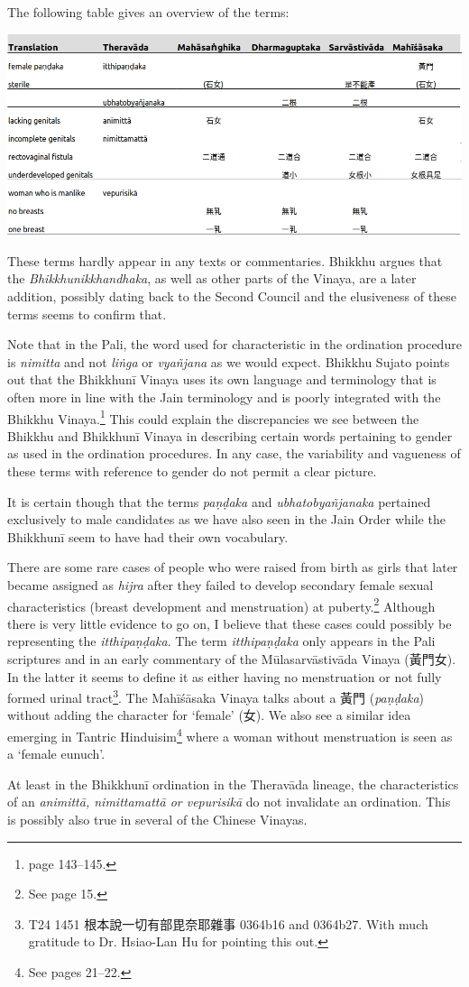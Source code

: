 The following table gives an overview of the terms:

\bigskip
\includegraphics[width=\linewidth]{female.jpg}
\label{female}

These terms hardly appear in any texts or commentaries. Bhikkhu \cite{sujato2009} argues that the {\em Bhikkhunikkhandhaka}, as well as other parts of the Vinaya, are a later addition, possibly dating back to the Second Council and the elusiveness of these terms seems to confirm that. 

Note that in the Pali, the word used for characteristic in the ordination procedure is {\em nimitta} and not {\em liṅga} or {\em vyañ­jana} as we would expect. Bhikkhu Sujato points out that the Bhikkhunī Vinaya uses its own language and terminology that is often more in line with the Jain terminology and is poorly integrated with the Bhikkhu Vinaya.\footnote{\cite{sujato2009} page 143–145.} This could explain the discrepancies we see between the Bhikkhu and Bhikkhunī Vinaya in describing certain words pertaining to gender as used in the ordination procedures. In any case, the variability and vagueness of these terms with reference to gender do not permit a clear picture. 

It is certain though that the terms {\em paṇḍaka} and {\em ubhatob­yañ­janaka} pertained exclusively to male candidates as we have also seen in the Jain Order while the Bhikkhunī seem to have had their own vocabulary.

There are some rare cases of people who were raised from birth as girls that later became assigned as {\em hijra} after they failed to develop secondary female sexual characteristics (breast development and menstruation) at puberty.\footnote{See \cite{nanda} page 15.} Although there is very little evidence to go on, I believe that these cases could possibly be representing the {\em itthipaṇḍaka}. The term {\em itthipaṇḍaka} only appears in the Pali scriptures and in an early commentary of the Mūlasarvāstivāda Vinaya (黃門女). In the latter it seems to define it as either having no menstruation or not fully formed urinal tract\footnote{T24 1451 根本說一切有部毘奈耶雜事 0364b16 and 0364b27. With much gratitude to Dr. Hsiao-Lan Hu for pointing this out.}. The Mahīśāsaka Vinaya talks about a 黃門 ({\em paṇḍaka}) without adding the character for `female' (女). We also see a similar idea emerging in Tantric Hinduisim\footnote{See \cite{nanda} pages 21–22.} where a woman without menstruation is seen as a `female eunuch'.

At least in the Bhikkhunī ordination in the Theravāda lineage, the characteristics of an {\em animittā, nimittamattā or vepurisikā} do not invalidate an ordination. This is possibly also true in several of the Chinese Vinayas.
